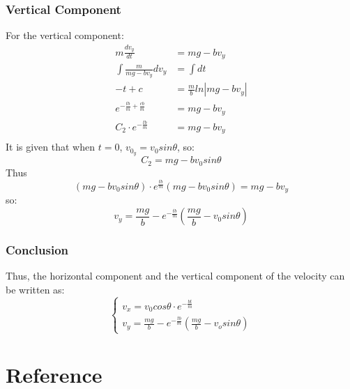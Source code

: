 \documentclass[conference]{IEEEtran}
\begin{document}
\subsubsection{Vertical Component}
For the vertical component:
\begin{equation}
    \begin{aligned}
        m\frac{dv_y}{dt} &= mg-bv_y\\
        \int \frac{m}{mg-bv_y}dv_y &= \int dt\\
        -t + c &= \frac{m}{b}ln|mg-bv_y| \\
        e^{-\frac{tb}{m} + \frac{cb}{m}} &= mg-bv_y\\
        C_2\cdot e^{-\frac{tb}{m}} &= mg-bv_y\\
    \end{aligned}
\end{equation}
It is given that when $t = 0$, $v_{0_y} = v_0sin\theta$, so:
$$C_2 = mg-bv_0sin\theta$$
Thus
$$(mg-bv_0sin\theta)\cdot e^{\frac{tb}{m}}(mg-bv_0sin\theta) = mg-bv_y$$
so:
\begin{equation} \label{y_air}
    v_y = \frac{mg}{b}-e^{-\frac{tb}{m}}(\frac{mg}{b}-v_0sin\theta)
\end{equation}
\subsubsection{Conclusion}
Thus, the horizontal component and the vertical component of the velocity can be written as:
\begin{equation*}
    \begin{cases}
    v_x = v_0cos\theta\cdot e^{-\frac{bt}{m}}\\
    v_y = \frac{mg}{b} - e^{-\frac{tb}{m}}(\frac{mg}{b}-v_osin\theta)
    \end{cases}
\end{equation*}

\section{Reference}
\printbibliography
\end{document}
